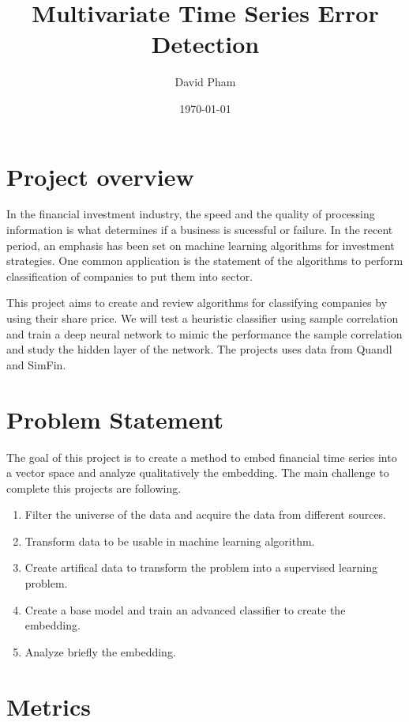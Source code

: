 \documentclass[a4paper,twoside]{article}
\author{David Pham}
\date{\today}
\title{Multivariate Time Series Error Detection}
\begin{document}
\maketitle
\tableofcontents


\section{Project overview}
\label{sec:orgc8da660}

In the financial investment industry, the speed and the quality of processing
information is what determines if a business is sucessful or failure. In the
recent period, an emphasis has been set on machine learning algorithms for
investment strategies. One common application is the statement of the algorithms
to perform classification of companies to put them into sector.

This project aims to create and review algorithms for classifying companies by
using their share price. We will test a heuristic classifier using sample
correlation and train a deep neural network to mimic the performance the sample
correlation and study the hidden layer of the network. The projects uses data
from Quandl and SimFin.

\section{Problem Statement}
\label{sec:org01d0b7f}

The goal of this project is to create a method to embed financial time series
into a vector space and analyze qualitatively the embedding. The main
challenge to complete this projects are following.

\begin{enumerate}
\item Filter the universe of the data and acquire the data from different
sources.
\item Transform data to be usable in machine learning algorithm.
\item Create artifical data to transform the problem into a supervised learning problem.
\item Create a base model and train an advanced classifier to create the embedding.
\item Analyze briefly the embedding.
\end{enumerate}


\section{Metrics}
\label{sec:orgab986c4}
\end{document}
